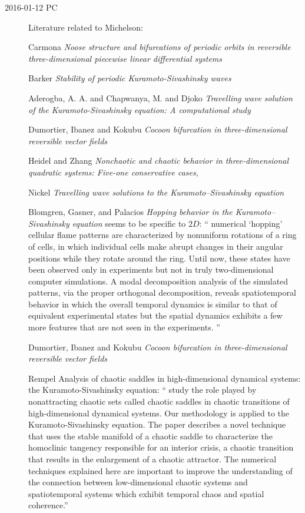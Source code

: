 \begin{description}


\item[2016-01-12 PC]  Literature
related to Michelson:

Carmona \etal{}
{\em Noose structure and bifurcations of periodic orbits in reversible
three-dimensional piecewise linear differential systems}

Barker \etal{}
{\em Stability of periodic { Kuramoto-Sivashinsky} waves}

Aderogba, A. A. and Chapwanya, M. and Djoko
{\em Travelling wave solution of the {Kuramoto-Sivashinsky} equation: A
computational study}


Dumortier,  Ibanez  and Kokubu
{\em Cocoon bifurcation in three-dimensional reversible vector fields}

Heidel and Zhang
{\em Nonchaotic and chaotic behavior in three-dimensional quadratic systems:
{Five}-one conservative cases},

Nickel
{\em Travelling wave solutions to the {Kuramoto–Sivashinsky} equation }

Blomgren, Gasner, and Palacios
{\em Hopping behavior in the Kuramoto–Sivashinsky equation}
seems to be specific to $2D$: `` numerical `hopping' cellular flame
patterns are characterized by nonuniform rotations of a ring of cells, in
which individual cells make abrupt changes in their angular positions
while they rotate around the ring. Until now, these states have been
observed only in experiments but not in truly two-dimensional computer
simulations. A modal decomposition analysis of the simulated patterns,
via the proper orthogonal decomposition, reveals spatiotemporal behavior
in which the overall temporal dynamics is similar to that of equivalent
experimental states but the spatial dynamics exhibits a few more features
that are not seen in the experiments.
''


Dumortier,  Ibanez  and Kokubu
{\em Cocoon bifurcation in three-dimensional reversible vector fields}

Rempel \etal{}
{Analysis of chaotic saddles in high-dimensional dynamical systems: the
{Kuramoto-Sivashinsky} equation}: ``
study the role played by nonattracting chaotic sets called chaotic
saddles in chaotic transitions of high-dimensional dynamical systems. Our
methodology is applied to the Kuramoto-Sivashinsky equation. The paper
describes a novel technique that uses the stable manifold of a chaotic
saddle to characterize the homoclinic tangency responsible for an
interior crisis, a chaotic transition that results in the enlargement of
a chaotic attractor. The numerical techniques explained here are
important to improve the understanding of the connection between
low-dimensional chaotic systems and spatiotemporal systems which exhibit
temporal chaos and spatial coherence.''


\end{description}
